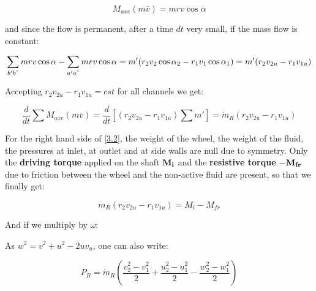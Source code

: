 \begin{equation}
M_{axe}(m\bar{v}) = m r v \cos \alpha 
\end{equation}

and since the flow is permanent, after a time $dt$ very small, if the mass flow is constant: 

\begin{equation}
\sum _{b'b^"} mr v \cos \alpha - \sum _{a'a^"} mr v \cos \alpha = m' (r_2v_2\cos \alpha _2-r_1v_1\cos \alpha _1) = m' (r_2 v_{2u} - r_1 v_{1u})
\end{equation}

Accepting $r_2 v_{2u} - r_1 v_{1u} = cst$ for all channels we get: 

\begin{equation}
\frac{d}{dt}\sum M_{axe}(m\bar{v}) = \frac{d}{dt}\left[(r_2 v_{2u} - r_1 v_{1u}) \sum m'\right] = \dot{m}_R (r_2 v_{2u} - r_1 v_{1u})
\end{equation}

For the right hand side of \eqref{3.2}, the weight of the wheel, the weight of the fluid, the pressures at inlet, at outlet and at side walls are null due to symmetry. Only the \textbf{driving torque} applied on the shaft $\bf{M_i}$ and the \textbf{resistive torque} $-\bf{M_{fr}}$ due to friction between the wheel and the non-active fluid are present, so that we finally get: 

\begin{equation}
\dot{m}_R (r_2 v_{2u} - r_1 v_{1u}) = M_i - M_{fr}
\end{equation}

And if we multiply by $\omega$: 

\begin{center}
\end{center}

As $w^2 = v^2 + u^2 - 2 u v_u$, one can also write: 

\begin{equation}
P_R = \dot{m}_R \left( \frac{v_2 ^2 - v_1^2}{2} + \frac{u_2 ^2 - u_1^2}{2} - \frac{w_2 ^2 - w_1^2}{2} \right)
\label{3.8}
\end{equation}

